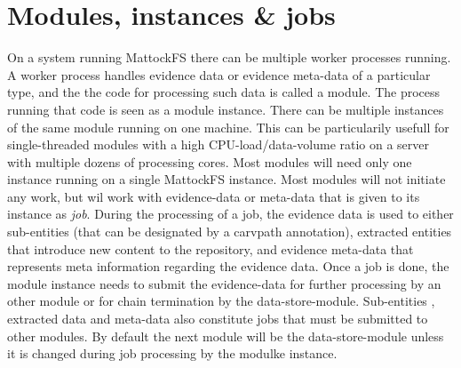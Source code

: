 \section{Modules, instances \& jobs}
On a system running MattockFS there can be multiple worker processes running. A worker process handles evidence data or evidence meta-data of a particular type, and the the code for processing such data is called a module. The process running that code is seen as a module instance. There can be multiple instances of the same module running on one machine. This can be particularily usefull for single-threaded modules with a high CPU-load/data-volume ratio on a server with multiple dozens of processing cores. Most modules will need only one instance running on a single MattockFS instance. Most modules will not initiate any work, but wil work with evidence-data or meta-data that is given to its instance as \emph{job}. During the processing of a job, the evidence data is used to either sub-entities (that can be designated by a carvpath annotation), extracted entities that introduce new content to the repository, and evidence meta-data that represents meta information regarding the evidence data. Once a job is done, the module instance needs to submit the evidence-data for further processing by an other module or for chain termination by the data-store-module. Sub-entities , extracted data and meta-data also constitute jobs that must be submitted to other modules. By default the next module will be the data-store-module unless it is changed during job processing by the modulke instance.
